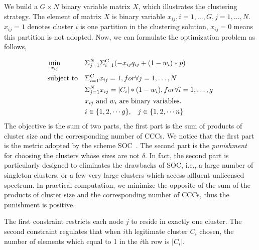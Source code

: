 \documentclass[10pt,journal,compsoc]{IEEEtran}
\theoremstyle{mytheoremstyle}
\theoremstyle{mytheoremstyle}
\theoremstyle{mytheoremstyle}
\newcommand{\ie}{i.e., }
\begin{document}
We build a $G\times N$ binary variable matrix $X$, which illustrates the clustering strategy.
The element of matrix $X$ is binary variable $x_{ij}, i=1, \ldots, G, j=1, \ldots, N$.
$x_{ij}=1$ denotes cluster $i$ is one partition in the clustering solution, $x_{ij}=0$ means this partition is not adopted.
Now, we can formulate the optimization problem as follows,

\begin{equation}
\begin{aligned}
     &\min\limits_{x_{ij}} && \Sigma_{j=1}^N\Sigma_{i=1}^G (-x_{ij}q_{ij} + (1-w_i)*p) \\
     &\text{subject to}   && \Sigma_{i=1}^G x_{ij} = 1, for \forall j=1, \ldots, N \\
   &&& \Sigma_{j=1}^N x_{ij} = |C_i|*(1-w_i), for \forall i=1, \ldots, g \\
   &&& \text{$x_{ij}$ and $w_i$ are binary variables.}\\
   &&& i\in \{1,2, \cdots g\}, \hspace{0.3cm} j\in \{1,2,\cdots n\}
\notag
\end{aligned}
\end{equation}
The objective is the sum of two parts, the first part is the sum of products of cluster size and the corresponding number of CCCs.
We notice that the first part is the metric adopted by the scheme SOC~\cite{Lazos09}.
The second part is the \textit{punishment} for choosing the clusters whose sizes are not $\delta$.
In fact, the second part is particularly designed to eliminates the drawbacks of SOC, \ie a large number of singleton clusters, or a few very large clusters which access affluent unlicensed spectrum.
In practical computation, we minimize the opposite of the sum of the products of cluster size and the corresponding number of CCCs, thus the punishment is positive.

The first constraint restricts each node $j$ to reside in exactly one cluster.
The second constraint regulates that when $i$th legitimate cluster $C_i$ chosen, the number of elements which equal to 1 in the $i$th row is $|C_i|$.
\end{document}
